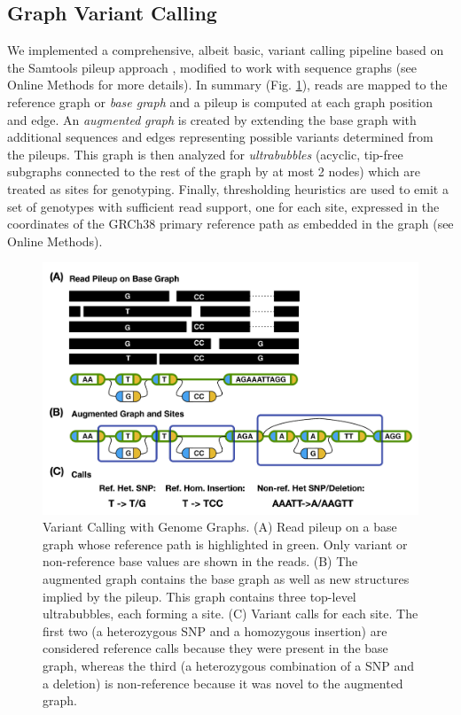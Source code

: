 \subsection{Graph Variant Calling}

We implemented a comprehensive, albeit basic, variant calling pipeline
based on the Samtools pileup approach \cite{Li2009-je}, modified to work
with sequence graphs (see Online Methods for more details). In summary
(Fig. \ref{fig:bakeoff:calling}), reads are mapped to the reference graph or \emph{base graph}
and a pileup is computed at each graph position and edge. An
\emph{augmented} \emph{graph} is created by extending the base graph
with additional sequences and edges representing possible variants
determined from the pileups. This graph is then analyzed for
\emph{ultrabubbles} (acyclic, tip-free subgraphs connected to the rest
of the graph by at most 2 nodes) which are treated as sites for
genotyping\cite{paten2017superbubbles}. Finally, thresholding heuristics
are used to emit a set of genotypes with sufficient read support, one
for each site, expressed in the coordinates of the GRCh38 primary
reference path as embedded in the graph (see Online Methods).

\begin{figure}[htbp]
\centering
\includegraphics[width=\textwidth]{figures/04_bakeoff/figure03.png}
\caption[Variant Calling with Genome Graphs]{Variant Calling with Genome Graphs. (A) Read pileup on a base
graph whose reference path is highlighted in green. Only variant or
non-reference base values are shown in the reads. (B) The augmented
graph contains the base graph as well as new structures implied by the
pileup. This graph contains three top-level ultrabubbles, each forming a
site. (C) Variant calls for each site. The first two (a heterozygous SNP
and a homozygous insertion) are considered reference calls because they
were present in the base graph, whereas the third (a heterozygous
combination of a SNP and a deletion) is non-reference because it was
novel to the augmented graph.}
\label{fig:bakeoff:calling}
\end{figure}

